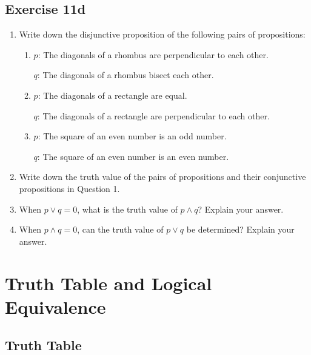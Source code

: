 \documentclass{report}
\begin{document}
\subsection*{Exercise 11d}
\begin{enumerate}[leftmargin=*]
    \item Write down the disjunctive proposition of the following pairs of propositions:
          \begin{enumerate}[label=(\alph*), leftmargin=*]
              \item $p$: The diagonals of a rhombus are perpendicular to each other.

                    $q$: The diagonals of a rhombus bisect each other.

              \item $p$: The diagonals of a rectangle are equal.

                    $q$: The diagonals of a rectangle are perpendicular to each other.

              \item $p$: The square of an even number is an odd number.

                    $q$: The square of an even number is an even number.
          \end{enumerate}

    \item Write down the truth value of the pairs of propositions and their conjunctive
          propositions in Question 1.

    \item When $p \lor q = 0$, what is the truth value of $p \land q$? Explain your
          answer.

    \item When $p \land q = 0$, can the truth value of $p \lor q$ be determined? Explain
          your answer.
\end{enumerate}

\section{Truth Table and Logical Equivalence}

\subsection*{Truth Table}
\end{document}
